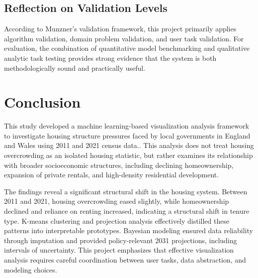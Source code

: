 \documentclass[conference]{IEEEtran}
\begin{document}
\subsection{Reflection on Validation Levels}
According to Munzner’s validation framework, this project primarily applies algorithm validation, domain problem validation, and user task validation. For  evaluation, the combination of quantitative model benchmarking and qualitative analytic task testing provides strong evidence that the system is both methodologically sound and practically useful.

\section{Conclusion}
This study developed a machine learning-based visualization analysis framework to investigate housing structure pressures faced by local governments in England and Wales using 2011 and 2021 census data.\cite{noauthor_census_nodate}. This analysis does not treat housing overcrowding as an isolated housing statistic, but rather examines its relationship with broader socioeconomic structures, including declining homeownership, expansion of private rentals, and high-density residential development.

The findings reveal a significant structural shift in the housing system. Between 2011 and 2021, housing overcrowding eased slightly, while homeownership declined and reliance on renting increased, indicating a structural shift in tenure type. K-means clustering and projection analysis effectively distilled these patterns into interpretable prototypes. Bayesian modeling ensured data reliability through imputation and provided policy-relevant 2031 projections, including intervals of uncertainty. This project emphasizes that effective visualization analysis requires careful coordination between user tasks, data abstraction, and modeling choices.



\end{document}
